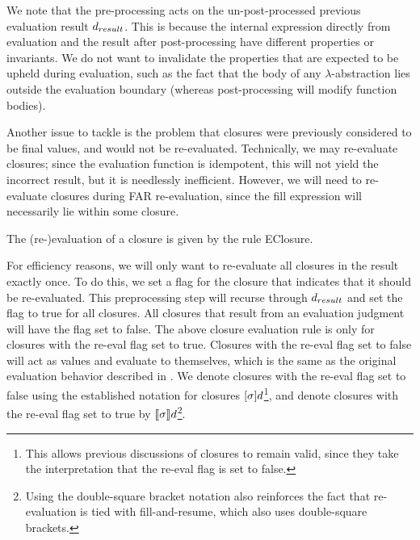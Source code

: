 We note that the pre-processing acts on the un-post-processed previous evaluation result $\dresult$. This is because the internal expression directly from evaluation and the result after post-processing have different properties or invariants. We do not want to invalidate the properties that are expected to be upheld during evaluation, such as the fact that the body of any $\lambda$-abstraction lies outside the evaluation boundary (whereas post-processing will modify function bodies).

Another issue to tackle is the problem that closures were previously considered to be final values, and would not be re-evaluated. Technically, we may re-evaluate closures; since the evaluation function is idempotent, this will not yield the incorrect result, but it is needlessly inefficient. However, we will need to re-evaluate closures during FAR re-evaluation, since the fill expression will necessarily lie within some closure.


The (re-)evaluation of a closure is given by the rule EClosure.

\begin{singlespace}
  \begin{mathpar}
  \end{mathpar}
\end{singlespace}

For efficiency reasons, we will only want to re-evaluate all closures in the result exactly once. To do this, we set a flag for the closure that indicates that it should be re-evaluated. This preprocessing step will recurse through $\dresult$ and set the flag to true for all closures. All closures that result from an evaluation judgment will have the flag set to false. The above closure evaluation rule is only for closures with the re-eval flag set to true. Closures with the re-eval flag set to false will act as values and evaluate to themselves, which is the same as the original evaluation behavior described in . We denote closures with the re-eval flag set to false using the established notation for closures $[\env]d$\footnote{This allows previous discussions of closures to remain valid, since they take the interpretation that the re-eval flag is set to false.}, and denote closures with the re-eval flag set to true by $\llbracket\env\rrbracket d$\footnote{Using the double-square bracket notation also reinforces the fact that re-evaluation is tied with fill-and-resume, which also uses double-square brackets.}.

